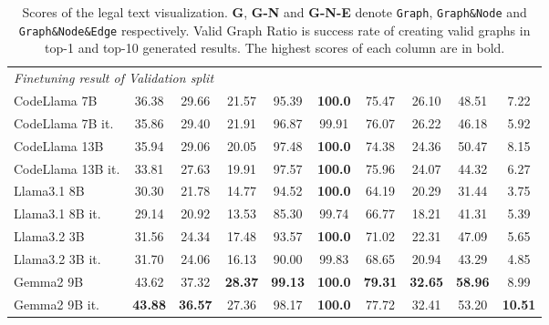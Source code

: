 \begin{table*}[t]
\begin{tabular}{lccccccccc}
\midrule
\multicolumn{7}{l}{\textit{Finetuning result of Validation split}} \\
CodeLlama 7B & 36.38 & 29.66 & 21.57 & 95.39 & \textbf{100.0} & 75.47 & 26.10 & 48.51 & 7.22\\
CodeLlama 7B it. \hspace{-1em}  & 35.86 & 29.40 & 21.91 & 96.87 & 99.91 &  76.07 & 26.22 & 46.18 & 5.92\\
CodeLlama 13B  & 35.94 & 29.06 & 20.05 & 97.48 & \textbf{100.0} & 74.38 & 24.36 & 50.47 & 8.15\\
CodeLlama 13B it.  & 33.81 & 27.63 & 19.91 & 97.57 & \textbf{100.0} & 75.96 & 24.07 & 44.32 & 6.27\\
Llama3.1 8B  & 30.30 & 21.78 & 14.77 & 94.52 & \textbf{100.0} & 64.19 & 20.29 & 31.44 & 3.75\\
Llama3.1 8B it. \hspace{-1em}  & 29.14 & 20.92 & 13.53 & 85.30 & 99.74 &  66.77 & 18.21 & 41.31 & 5.39\\
Llama3.2 3B  & 31.56 & 24.34 & 17.48 & 93.57 & \textbf{100.0} & 71.02 & 22.31 & 47.09 & 5.65\\
Llama3.2 3B it. \hspace{-1em}  & 31.70 & 24.06 & 16.13 & 90.00 & 99.83 &  68.65 & 20.94 & 43.29 & 4.85\\
Gemma2 9B   & 43.62 & 37.32 & \textbf{28.37} & \textbf{99.13} & \textbf{100.0} & \textbf{79.31} & \textbf{32.65} & \textbf{58.96} & 8.99 \\
Gemma2 9B it.  & \textbf{43.88} & \textbf{36.57} & 27.36 & 98.17 & \textbf{100.0} & 77.72 & 32.41 & 53.20 & \textbf{10.51}\\
\bottomrule
\end{tabular}
\caption{
Scores of the legal text visualization. 
\textbf{G}, \textbf{G-N} and \textbf{G-N-E} denote \texttt{Graph}, \texttt{Graph\&Node} and  \texttt{Graph\&Node\&Edge} respectively. Valid Graph Ratio is success rate of creating valid graphs in top-1 and top-10 generated results.
The highest scores of each column are in bold.
}
\label{table:main_result_appendix}
\end{table*}




